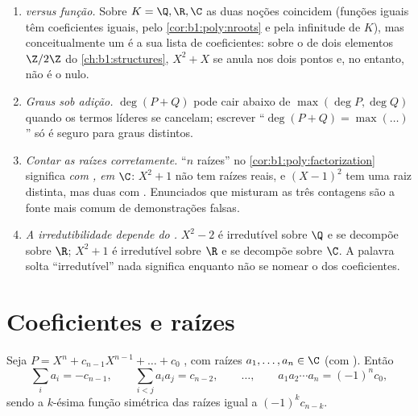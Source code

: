 \begin{remark}\label{rem:b1:poly:pitfalls}
\begin{enumerate}
  \item \emph{ versus função.} Sobre $K = \Q, \R, \C$
        as duas noções coincidem (funções iguais têm coeficientes
        iguais, pelo \cref{cor:b1:poly:nroots} e pela
        infinitude de $K$), mas conceitualmente um  é
        a sua lista de coeficientes: sobre o  de dois elementos
        $\Z/2\Z$ do \cref{ch:b1:structures}, $X^2 + X$ se anula
        nos dois pontos e, no entanto, não é o  nulo.
  \item \emph{Graus sob adição.} $\deg(P + Q)$ pode cair
        abaixo de $\max(\deg P, \deg Q)$ quando os termos líderes se cancelam;
        escrever ``$\deg(P + Q) = \max(\dots)$'' só é seguro para
        graus distintos.
  \item \emph{Contar as raízes corretamente.} ``$n$ raízes'' no
        \cref{cor:b1:poly:factorization} significa \emph{com
        , em $\C$}: $X^2 + 1$ não tem raízes reais, e
        $(X-1)^2$ tem uma raiz distinta, mas duas com
        . Enunciados que misturam as três contagens são a
        fonte mais comum de demonstrações falsas.
  \item \emph{A irredutibilidade depende do .} $X^2 - 2$ é
        irredutível sobre $\Q$ e se decompõe sobre $\R$; $X^2 + 1$ é
        irredutível sobre $\R$ e se decompõe sobre $\C$. A palavra
        solta ``irredutível'' nada significa enquanto não se nomear o
         dos coeficientes.
\end{enumerate}
\end{remark}

\section{Coeficientes e raízes}

\begin{theorem}\label{thm:b1:poly:vieta}
Seja $P = X^n + c_{n-1} X^{n-1} + \dots + c_0$ , com raízes
$a_1, \dots, a_n \in \C$ (com ). Então
\[
\sum_i a_i = -c_{n-1},
\qquad
\sum_{i < j} a_i a_j = c_{n-2},
\qquad \dots, \qquad
a_1 a_2 \cdots a_n = (-1)^n c_0 ,
\]
sendo a $k$-ésima função simétrica das raízes igual a $(-1)^k c_{n-k}$.
\end{theorem}

